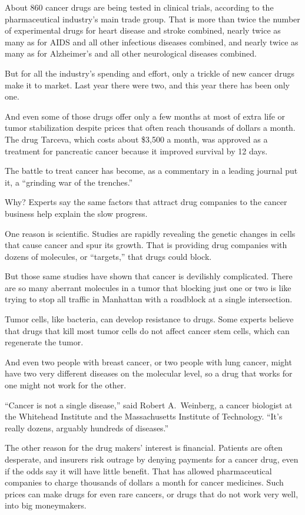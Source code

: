 ﻿\documentclass[12pt]{article}
\begin{document}
About 860 cancer drugs are being tested in clinical trials, according to the pharmaceutical
industry's main trade group. That is more than twice the number of experimental drugs for heart
disease and stroke combined, nearly twice as many as for AIDS and all other infectious diseases
combined, and nearly twice as many as for Alzheimer's and all other neurological diseases combined.

But for all the industry's spending and effort, only a trickle\cite{trickle} of new cancer drugs
make it to market. Last year there were two, and this year there has been only one.

And even some of those drugs offer only a few months at most of extra life or tumor stabilization
despite prices that often reach thousands of dollars a month. The drug Tarceva, which costs about
\$3,500 a month, was approved as a treatment for pancreatic cancer because it improved survival by
12 days.

The battle to treat cancer has become, as a commentary in a leading journal put it, a ``grinding war
of the trenches.''

Why? Experts say the same factors that attract drug companies to the cancer business help explain
the slow progress.

One reason is scientific. Studies are rapidly revealing the genetic changes in cells that cause
cancer and spur its growth. That is providing drug companies with dozens of molecules, or
``targets,'' that drugs could block.

But those same studies have shown that cancer is devilishly complicated. There are so many aberrant
molecules in a tumor that blocking just one or two is like trying to stop all traffic in Manhattan
with a roadblock at a single intersection.

Tumor cells, like bacteria, can develop resistance to drugs. Some experts believe that drugs that
kill most tumor cells do not affect cancer stem cells, which can regenerate the tumor.

And even two people with breast cancer, or two people with lung cancer, might have two very
different diseases on the molecular level, so a drug that works for one might not work for the
other.

``Cancer is not a single disease,'' said Robert A.~Weinberg, a cancer biologist at the Whitehead
Institute and the Massachusetts Institute of Technology. ``It's really dozens, arguably hundreds of
diseases.''

The other reason for the drug makers' interest is financial. Patients are often desperate, and
insurers risk outrage by denying payments for a cancer drug, even if the odds say it will have
little benefit. That has allowed pharmaceutical companies to charge thousands of dollars a month for
cancer medicines. Such prices can make drugs for even rare cancers, or drugs that do not work very
well, into big moneymakers.
\end{document}
